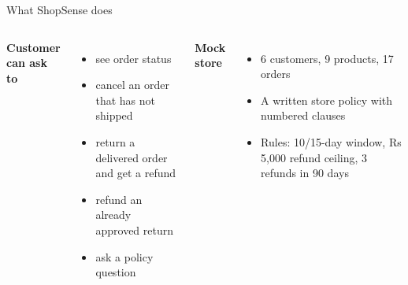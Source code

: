 \documentclass[aspectratio=169,12pt]{beamer}
\begin{document}
\begin{frame}{What ShopSense does}
\begin{columns}[T]
\textbf{Customer can ask to}
\begin{itemize}\setlength{\itemsep}{3pt}
  \item see order status
  \item cancel an order that has not shipped
  \item return a delivered order and get a refund
  \item refund an already approved return
  \item ask a policy question
\end{itemize}
\textbf{Mock store}
\begin{itemize}\setlength{\itemsep}{3pt}
  \item 6 customers, 9 products, 17 orders
  \item A written store policy with numbered clauses
  \item Rules: 10/15-day window, Rs 5,000 refund ceiling, 3 refunds in 90 days
\end{itemize}
\end{columns}
\end{frame}
\end{document}

